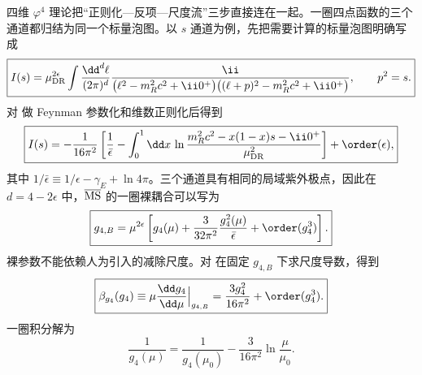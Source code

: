 四维 \(\varphi^4\) 理论把“正则化—反项—尺度流”三步直接连在一起。一圈四点函数的三个通道都归结为同一个标量泡图。以 \(s\) 通道为例，先把需要计算的标量泡图明确写成
\begin{equation}
 \boxed{
 I(s)=\mu_{\rm DR}^{2\epsilon}
 \int\frac{\dd^d \ell}{(2\pi)^d}
 \frac{\ii}
 {\bigl(\ell^2-m_R^2c^2+\ii0^+\bigr)
  \bigl((\ell+p)^2-m_R^2c^2+\ii0^+\bigr)},
 \qquad p^2=s.}
 \label{eq:phi4-bubble-integral-r68}
\end{equation}
对 做 Feynman 参数化和维数正则化后得到
\begin{equation}
 \boxed{
 I(s)
 =-\frac1{16\pi^2}
 \left[
 \frac1{\bar\epsilon}
 -\int_0^1\dd x\,
 \ln\frac{m_R^2c^2-x(1-x)s-\ii0^+}{\mu_{\rm DR}^2}
 \right]
 +\order(\epsilon),}
 \label{eq:phi4-bubble-result-dp10}
\end{equation}
其中 \(1/\bar\epsilon\equiv1/\epsilon-\gamma_E+\ln4\pi\)。三个通道具有相同的局域紫外极点，因此在 $d=4-2\epsilon$ 中，$\overline{\rm MS}$ 的一圈裸耦合可以写为
\begin{equation}
 \boxed{
 g_{4,B}
 =\mu^{2\epsilon}
 \left[
 g_4(\mu)
 +\frac{3}{32\pi^2}\frac{g_4^2(\mu)}{\bar\epsilon}
 +\order(g_4^3)
 \right].}
 \label{eq:phi4-bare-coupling-r68}
\end{equation}
裸参数不能依赖人为引入的减除尺度。对 在固定 $g_{4,B}$ 下求尺度导数，得到
\begin{equation}
 \boxed{
 \beta_{g_4}(g_4)
 \equiv
 \mu\frac{\dd g_4}{\dd\mu}\Big|_{g_{4,B}}
 =\frac{3g_4^2}{16\pi^2}+\order(g_4^3).}
 \label{eq:phi4-beta-one-loop-dp10}
\end{equation}
一圈积分解为
\begin{equation}
 \boxed{
 \frac1{g_4(\mu)}
 =\frac1{g_4(\mu_0)}
 -\frac{3}{16\pi^2}\ln\frac\mu{\mu_0}.}
 \label{eq:phi4-running-one-loop-dp10}
\end{equation}

